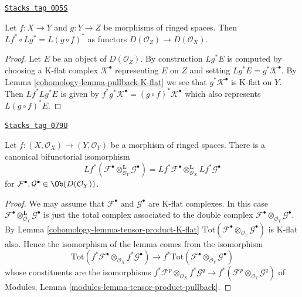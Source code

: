 \begin{lemma}
\label{cohomology-lemma-derived-pullback-composition}
\href{https://stacks.math.columbia.edu/tag/0D5S}{\texttt{Stacks tag 0D5S}}

Let $f : X \to Y$ and $g : Y \to Z$ be morphisms of ringed spaces.
Then $Lf^* \circ Lg^* = L(g \circ f)^*$ as functors
$D(\mathcal{O}_Z) \to D(\mathcal{O}_X)$.
\end{lemma}

\begin{proof}

Let $E$ be an object of $D(\mathcal{O}_Z)$.
By construction $Lg^*E$ is computed by choosing a K-flat complex
$\mathcal{K}^\bullet$ representing $E$ on $Z$ and
setting $Lg^*E = g^*\mathcal{K}^\bullet$.
By Lemma \ref{cohomology-lemma-pullback-K-flat} we see that $g^*\mathcal{K}^\bullet$
is K-flat on $Y$. Then $Lf^*Lg^*E$ is given by
$f^*g^*\mathcal{K}^\bullet = (g \circ f)^*\mathcal{K}^\bullet$
which also represents $L(g \circ f)^*E$.
\end{proof}

\begin{lemma}
\label{cohomology-lemma-pullback-tensor-product}
\href{https://stacks.math.columbia.edu/tag/079U}{\texttt{Stacks tag 079U}}

Let $f : (X, \mathcal{O}_X) \to (Y, \mathcal{O}_Y)$
be a morphism of ringed spaces. There is a canonical bifunctorial
isomorphism
$$
Lf^*(
\mathcal{F}^\bullet \otimes_{\mathcal{O}_Y}^{\mathbf{L}} \mathcal{G}^\bullet
) =
Lf^*\mathcal{F}^\bullet
\otimes_{\mathcal{O}_X}^{\mathbf{L}}
Lf^*\mathcal{G}^\bullet
$$
for $\mathcal{F}^\bullet, \mathcal{G}^\bullet \in \Ob(D(\mathcal{O}_Y))$.
\end{lemma}

\begin{proof}

We may assume that $\mathcal{F}^\bullet$ and $\mathcal{G}^\bullet$
are K-flat complexes. In this case
$\mathcal{F}^\bullet \otimes_{\mathcal{O}_Y}^{\mathbf{L}} \mathcal{G}^\bullet$
is just the total complex associated to the double complex
$\mathcal{F}^\bullet \otimes_{\mathcal{O}_Y} \mathcal{G}^\bullet$.
By
Lemma \ref{cohomology-lemma-tensor-product-K-flat}
$\text{Tot}(\mathcal{F}^\bullet \otimes_{\mathcal{O}_Y} \mathcal{G}^\bullet)$
is K-flat also. Hence the isomorphism of the lemma comes from the
isomorphism
$$
\text{Tot}(f^*\mathcal{F}^\bullet \otimes_{\mathcal{O}_X}
f^*\mathcal{G}^\bullet)
\longrightarrow
f^*\text{Tot}(\mathcal{F}^\bullet \otimes_{\mathcal{O}_Y} \mathcal{G}^\bullet)
$$
whose constituents are the isomorphisms
$f^*\mathcal{F}^p \otimes_{\mathcal{O}_X} f^*\mathcal{G}^q \to
f^*(\mathcal{F}^p \otimes_{\mathcal{O}_Y} \mathcal{G}^q)$ of
Modules, Lemma \ref{modules-lemma-tensor-product-pullback}.
\end{proof}

